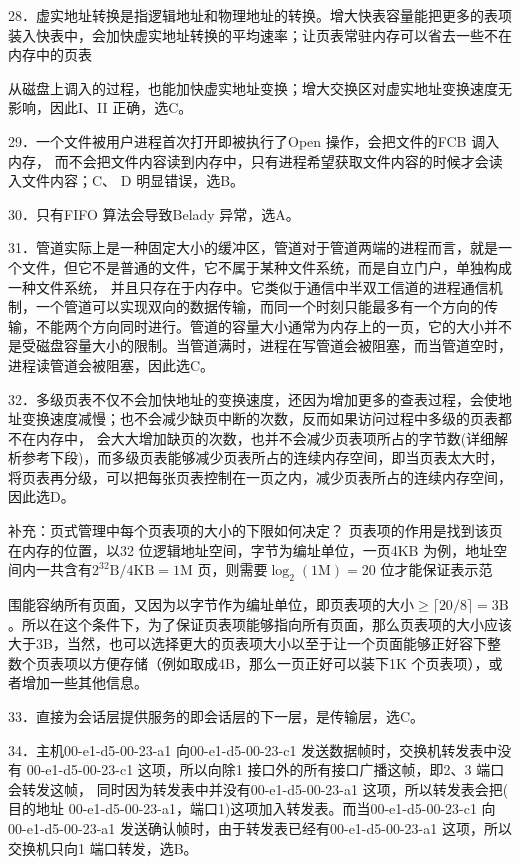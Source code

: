 \documentclass[UTF8,11pt]{ctexart}
\begin{document}
28．虚实地址转换是指逻辑地址和物理地址的转换。增大快表容量能把更多的表项装入快表中，会加快虚实地址转换的平均速率；让页表常驻内存可以省去一些不在内存中的页表


从磁盘上调入的过程，也能加快虚实地址变换；增大交换区对虚实地址变换速度无影响，因此I、II 正确，选C。


29．一个文件被用户进程首次打开即被执行了Open 操作，会把文件的FCB 调入内存， 而不会把文件内容读到内存中，只有进程希望获取文件内容的时候才会读入文件内容；C、 D 明显错误，选B。


30．只有FIFO 算法会导致Belady 异常，选A。


31．管道实际上是一种固定大小的缓冲区，管道对于管道两端的进程而言，就是一个文件，但它不是普通的文件，它不属于某种文件系统，而是自立门户，单独构成一种文件系统， 并且只存在于内存中。它类似于通信中半双工信道的进程通信机制，一个管道可以实现双向的数据传输，而同一个时刻只能最多有一个方向的传输，不能两个方向同时进行。管道的容量大小通常为内存上的一页，它的大小并不是受磁盘容量大小的限制。当管道满时，进程在写管道会被阻塞，而当管道空时，进程读管道会被阻塞，因此选C。


32．多级页表不仅不会加快地址的变换速度，还因为增加更多的查表过程，会使地址变换速度减慢；也不会减少缺页中断的次数，反而如果访问过程中多级的页表都不在内存中， 会大大增加缺页的次数，也并不会减少页表项所占的字节数(详细解析参考下段)，而多级页表能够减少页表所占的连续内存空间，即当页表太大时，将页表再分级，可以把每张页表控制在一页之内，减少页表所占的连续内存空间，因此选D。


补充：页式管理中每个页表项的大小的下限如何决定？ 页表项的作用是找到该页在内存的位置，以32 位逻辑地址空间，字节为编址单位，一页4KB 为例，地址空间内一共含有\(\displaystyle 2^{32}\mathrm B/4\mathrm{KB}=1\mathrm M\) 页，则需要\(\displaystyle \log_2(1\mathrm M)=20\) 位才能保证表示范


围能容纳所有页面，又因为以字节作为编址单位，即页表项的大小\(\displaystyle \ge\lceil20/8\rceil=3\mathrm B\)。所以在这个条件下，为了保证页表项能够指向所有页面，那么页表项的大小应该大于3B，当然，也可以选择更大的页表项大小以至于让一个页面能够正好容下整数个页表项以方便存储（例如取成4B，那么一页正好可以装下1K 个页表项），或者增加一些其他信息。


33．直接为会话层提供服务的即会话层的下一层，是传输层，选C。


34．主机00-e1-d5-00-23-a1 向00-e1-d5-00-23-c1 发送数据帧时，交换机转发表中没有 00-e1-d5-00-23-c1 这项，所以向除1 接口外的所有接口广播这帧，即2、3 端口会转发这帧， 同时因为转发表中并没有00-e1-d5-00-23-a1 这项，所以转发表会把( 目的地址 00-e1-d5-00-23-a1，端口1)这项加入转发表。而当00-e1-d5-00-23-c1 向00-e1-d5-00-23-a1 发送确认帧时，由于转发表已经有00-e1-d5-00-23-a1 这项，所以交换机只向1 端口转发，选B。
\end{document}
